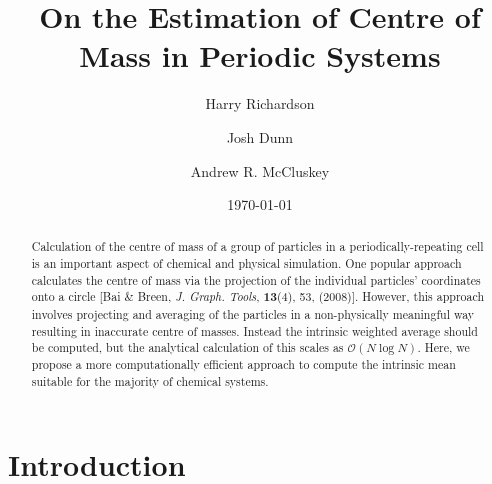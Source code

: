 \documentclass[reprint,superscriptaddress,nobibnotes,amsmath,amssymb,aip]{revtex4-2}
\newcommand{\papertitle}{On the Estimation of Centre of Mass in Periodic Systems}
\begin{document}
\let\oldaddcontentsline\addcontentsline
\renewcommand{\addcontentsline}[3]{}

\title[Accurate Centre of Mass Estimation]{\papertitle}

\author{Harry Richardson}
\author{Josh Dunn}
\author{Andrew R. McCluskey}

\date{\today}

\begin{abstract}
Calculation of the centre of mass of a group of particles in a periodically-repeating cell is an important aspect of chemical and physical simulation. 
One popular approach calculates the centre of mass via the projection of the individual particles' coordinates onto a circle [Bai \& Breen, \emph{J. Graph. Tools}, \textbf{13}(4), 53, (2008)].
However, this approach involves projecting and averaging of the particles in a non-physically meaningful way resulting in inaccurate centre of masses. 
Instead the intrinsic weighted average should be computed, but the analytical calculation of this scales as $\mathcal{O}(N\log N)$. 
Here, we propose a more computationally efficient approach to compute the intrinsic mean suitable for the majority of chemical systems. 
\end{abstract}

\maketitle

\section{Introduction}
\label{sec:intro}
\end{document}
